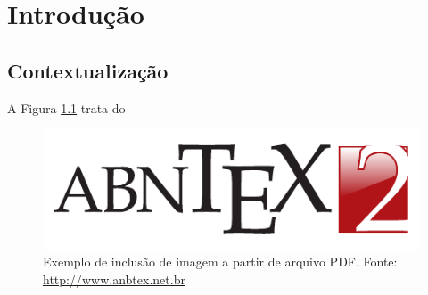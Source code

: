 %

\chapter{Introdução}

\lipsum[3]

\section{Contextualização}
A Figura \ref{fig:fig01} trata do \lipsum[1-3]

\begin{figure}[!htb]
	\label{fig:fig01}
	\begin{center}
		\includegraphics[scale=0.60]{capitulos/imgs/abntex2-modelo-img-marca.pdf}
	\end{center}
	\caption{Exemplo de inclusão de imagem a partir de arquivo PDF. Fonte: \url{http://www.anbtex.net.br}}
\end{figure}

\lipsum[3]
